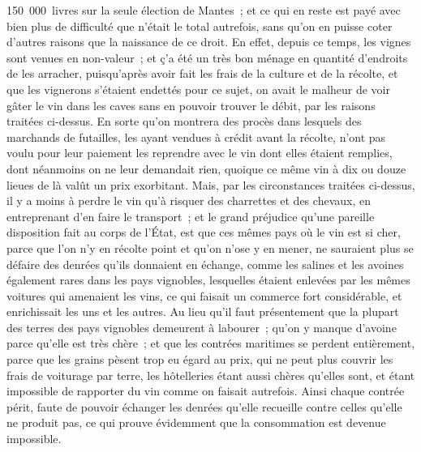 \documentclass[french,twoside]{book} %
\begin{document}
150 000 livres sur la seule élection de Mantes ; et ce qui en reste est payé avec bien plus de difficulté que n’était le total autrefois, sans qu’on en puisse coter d’autres raisons que la naissance de ce droit. En effet, depuis ce temps, les vignes sont venues en non-valeur ; et ç’a été un très bon ménage en quantité d’endroits de les arracher, puisqu’après avoir fait les frais de la culture et de la récolte, et que les vignerons s’étaient endettés pour ce sujet, on avait le malheur de voir gâter le vin dans les caves sans en pouvoir trouver le débit, par les raisons traitées ci-dessus. En sorte qu’on montrera des procès dans lesquels des marchands de futailles, les ayant vendues à crédit avant la récolte, n’ont pas voulu pour leur paiement les reprendre avec le vin dont elles étaient remplies, dont néanmoins on ne leur demandait rien, quoique ce même vin à dix ou douze lieues de là valût un prix exorbitant. Mais, par les circonstances traitées ci-dessus, il y a moins à perdre le vin qu’à risquer des charrettes et des chevaux, en entreprenant d’en faire le transport ; et le grand préjudice qu’une pareille disposition fait au corps de l’État, est que ces mêmes pays où le vin est si cher, parce que l’on n’y en récolte point et qu’on n’ose y en mener, ne sauraient plus se défaire des denrées qu’ils donnaient en échange, comme les salines et les avoines également rares dans les pays vignobles, lesquelles étaient enlevées par les mêmes voitures qui amenaient les vins, ce qui faisait un commerce fort considérable, et enrichissait les uns et les autres. Au lieu qu’il faut présentement que la plupart des terres des pays vignobles demeurent à labourer ; qu’on y manque d’avoine parce qu’elle est très chère ; et que les contrées maritimes se perdent entièrement, parce que les grains pèsent trop eu égard au prix, qui ne peut plus couvrir les frais de voiturage par terre, les hôtelleries étant aussi chères qu’elles sont, et étant impossible de rapporter du vin comme on faisait autrefois. Ainsi chaque contrée périt, faute de pouvoir échanger les denrées qu’elle recueille contre celles qu’elle ne produit pas, ce qui prouve évidemment que la consommation est devenue impossible.
\end{document}
